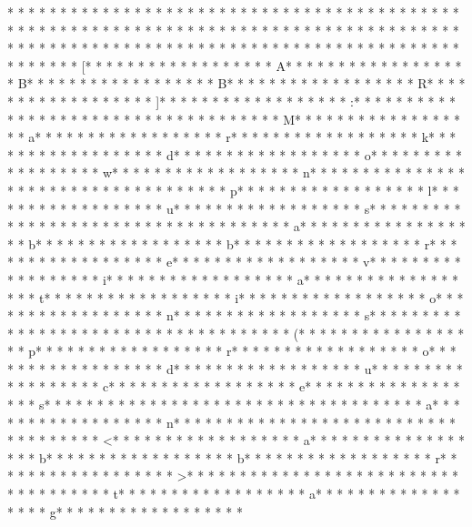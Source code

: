 * * *  * * *  * * *  *  * * *  *  * * *  * * *  * * *  *  * * *  *  * * *  * * *  * * *  *  * * *  *  * * *  *  * * *  * * *  * * *  *  * * *  *  * * *  *  * * *  * * *  * * *  *  * * *  *  * * *  *  * * *  * * *  * * *  *  * * *  *  * * *  *  * * *  * * *  * * *  *  * * *  *  * * *  *  * * *  * * *  * * *  *  * * *  *  * * *  * [* * *  * * *  * * *  *  * * *  *  * * *  * A* * *  * * *  * * *  *  * * *  *  * * *  * B* * *  * * *  * * *  *  * * *  *  * * *  * B* * *  * * *  * * *  *  * * *  *  * * *  * R* * *  * * *  * * *  *  * * *  *  * * *  * ]* * *  * * *  * * *  *  * * *  *  * * *  * :* * *  * * *  * * *  *  * * *  *  * * *  *  * * *  * * *  * * *  *  * * *  *  * * *  * M* * *  * * *  * * *  *  * * *  *  * * *  * a* * *  * * *  * * *  *  * * *  *  * * *  * r* * *  * * *  * * *  *  * * *  *  * * *  * k* * *  * * *  * * *  *  * * *  *  * * *  * d* * *  * * *  * * *  *  * * *  *  * * *  * o* * *  * * *  * * *  *  * * *  *  * * *  * w* * *  * * *  * * *  *  * * *  *  * * *  * n* * *  * * *  * * *  *  * * *  *  * * *  *  * * *  * * *  * * *  *  * * *  *  * * *  * p* * *  * * *  * * *  *  * * *  *  * * *  * l* * *  * * *  * * *  *  * * *  *  * * *  * u* * *  * * *  * * *  *  * * *  *  * * *  * s* * *  * * *  * * *  *  * * *  *  * * *  *  * * *  * * *  * * *  *  * * *  *  * * *  * a* * *  * * *  * * *  *  * * *  *  * * *  * b* * *  * * *  * * *  *  * * *  *  * * *  * b* * *  * * *  * * *  *  * * *  *  * * *  * r* * *  * * *  * * *  *  * * *  *  * * *  * e* * *  * * *  * * *  *  * * *  *  * * *  * v* * *  * * *  * * *  *  * * *  *  * * *  * i* * *  * * *  * * *  *  * * *  *  * * *  * a* * *  * * *  * * *  *  * * *  *  * * *  * t* * *  * * *  * * *  *  * * *  *  * * *  * i* * *  * * *  * * *  *  * * *  *  * * *  * o* * *  * * *  * * *  *  * * *  *  * * *  * n* * *  * * *  * * *  *  * * *  *  * * *  * s* * *  * * *  * * *  *  * * *  *  * * *  *  * * *  * * *  * * *  *  * * *  *  * * *  * (* * *  * * *  * * *  *  * * *  *  * * *  * p* * *  * * *  * * *  *  * * *  *  * * *  * r* * *  * * *  * * *  *  * * *  *  * * *  * o* * *  * * *  * * *  *  * * *  *  * * *  * d* * *  * * *  * * *  *  * * *  *  * * *  * u* * *  * * *  * * *  *  * * *  *  * * *  * c* * *  * * *  * * *  *  * * *  *  * * *  * e* * *  * * *  * * *  *  * * *  *  * * *  * s* * *  * * *  * * *  *  * * *  *  * * *  *  * * *  * * *  * * *  *  * * *  *  * * *  * a* * *  * * *  * * *  *  * * *  *  * * *  * n* * *  * * *  * * *  *  * * *  *  * * *  *  * * *  * * *  * * *  *  * * *  *  * * *  * <* * *  * * *  * * *  *  * * *  *  * * *  * a* * *  * * *  * * *  *  * * *  *  * * *  * b* * *  * * *  * * *  *  * * *  *  * * *  * b* * *  * * *  * * *  *  * * *  *  * * *  * r* * *  * * *  * * *  *  * * *  *  * * *  * >* * *  * * *  * * *  *  * * *  *  * * *  *  * * *  * * *  * * *  *  * * *  *  * * *  * t* * *  * * *  * * *  *  * * *  *  * * *  * a* * *  * * *  * * *  *  * * *  *  * * *  * g* * *  * * *  * * *  *  * * *  *  * * *  * 
